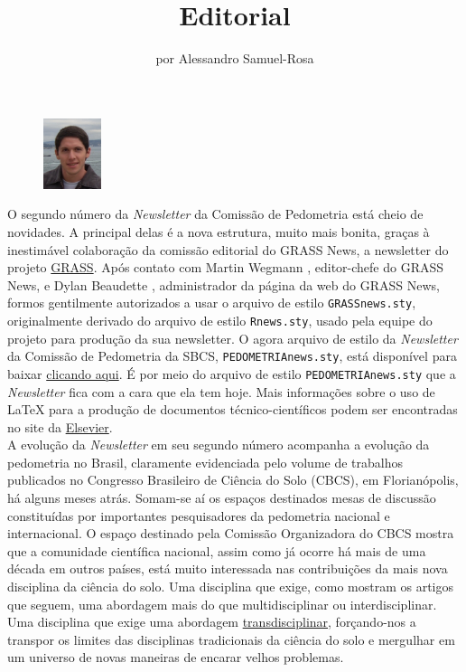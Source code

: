 \title{Editorial}
\author{por Alessandro Samuel-Rosa}
\maketitle
\begin{figure}
\includegraphics[width=0.15\textwidth]{figuras/foto-alessandro}
\end{figure}
O segundo número da \textit{Newsletter} da Comissão de Pedometria está cheio de novidades. A principal delas é a nova estrutura, muito mais bonita, graças à inestimável colaboração da comissão editorial do GRASS News, a newsletter do projeto \href{http://grass.osgeo.org/newsletter/}{GRASS}. Após contato com Martin Wegmann , editor-chefe do GRASS News, e Dylan Beaudette , administrador da página da web do GRASS News, formos gentilmente autorizados a usar o arquivo de estilo \texttt{GRASSnews.sty}, originalmente derivado do arquivo de estilo \texttt{Rnews.sty}, usado pela equipe do projeto \R{} para produção da sua newsletter. O agora arquivo de estilo da \textit{Newsletter} da Comissão de Pedometria da SBCS, \texttt{PEDOMETRIAnews.sty}, está disponível para baixar \href{http://goo.gl/OBWF3s}{clicando aqui}. É por meio do arquivo de estilo \texttt{PEDOMETRIAnews.sty} que a \textit{Newsletter} fica com a cara que ela tem hoje. Mais informações sobre o uso de \LaTeX{} para a produção de documentos técnico-científicos podem ser encontradas no site da \href{http://www.elsevier.com/author-schemas/preparing-documents-with-tex}{Elsevier}.\\
A evolução da \textit{Newsletter} em seu segundo número acompanha a evolução da pedometria no Brasil, claramente evidenciada pelo volume de trabalhos publicados no Congresso Brasileiro de Ciência do Solo (CBCS), em Florianópolis, há alguns meses atrás. Somam-se aí os espaços destinados mesas de discussão constituídas por importantes pesquisadores da pedometria nacional e internacional. O espaço destinado pela Comissão Organizadora do CBCS mostra que a comunidade científica nacional, assim como já ocorre há mais de uma década em outros países, está muito interessada nas contribuições da mais nova disciplina da ciência do solo. Uma disciplina que exige, como mostram os artigos que seguem, uma abordagem mais do que multidisciplinar ou interdisciplinar. Uma disciplina que exige uma abordagem \href{http://www.fisica-interessante.com/files/artigo-transdisciplinaridade.pdf}{transdisciplinar}, forçando-nos a transpor os limites das disciplinas tradicionais da ciência do solo e mergulhar em um universo de novas maneiras de 
encarar velhos problemas.

